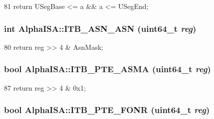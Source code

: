 \begin{DoxyCode}
81 { return USegBase <= a && a <= USegEnd; }
\end{DoxyCode}
\hypertarget{namespaceAlphaISA_aad79c10d320bef0ef127913e19eb2c5d}{
\subsubsection[{ITB\_\-ASN\_\-ASN}]{\setlength{\rightskip}{0pt plus 5cm}int AlphaISA::ITB\_\-ASN\_\-ASN (uint64\_\-t {\em reg})}}
\label{namespaceAlphaISA_aad79c10d320bef0ef127913e19eb2c5d}



\begin{DoxyCode}
80 { return reg >> 4 & AsnMask; }
\end{DoxyCode}
\hypertarget{namespaceAlphaISA_a198dd6b2a31db4d72de90c9e4d02d9fc}{
\subsubsection[{ITB\_\-PTE\_\-ASMA}]{\setlength{\rightskip}{0pt plus 5cm}bool AlphaISA::ITB\_\-PTE\_\-ASMA (uint64\_\-t {\em reg})}}
\label{namespaceAlphaISA_a198dd6b2a31db4d72de90c9e4d02d9fc}



\begin{DoxyCode}
87 { return reg >> 4 & 0x1; }
\end{DoxyCode}
\hypertarget{namespaceAlphaISA_a6fd8f27f8a622d14744aaa0fc16ef7d2}{
\subsubsection[{ITB\_\-PTE\_\-FONR}]{\setlength{\rightskip}{0pt plus 5cm}bool AlphaISA::ITB\_\-PTE\_\-FONR (uint64\_\-t {\em reg})}}
\label{namespaceAlphaISA_a6fd8f27f8a622d14744aaa0fc16ef7d2}




